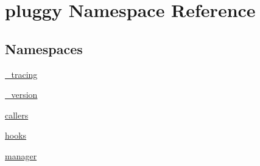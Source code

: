 \hypertarget{namespacepluggy}{}\section{pluggy Namespace Reference}
\label{namespacepluggy}
\subsection*{Namespaces}
\begin{DoxyCompactItemize}
\item 
 \hyperlink{namespacepluggy_1_1__tracing}{\+\_\+tracing}
\item 
 \hyperlink{namespacepluggy_1_1__version}{\+\_\+version}
\item 
 \hyperlink{namespacepluggy_1_1callers}{callers}
\item 
 \hyperlink{namespacepluggy_1_1hooks}{hooks}
\item 
 \hyperlink{namespacepluggy_1_1manager}{manager}
\end{DoxyCompactItemize}
